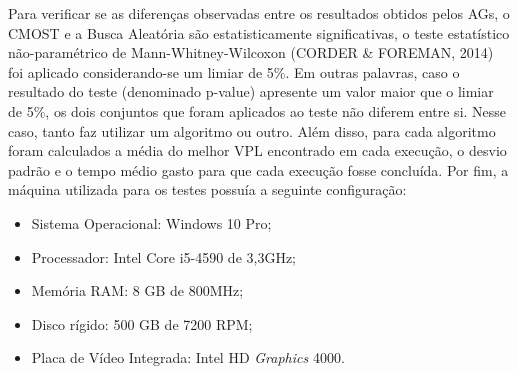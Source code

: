 \documentclass[12pt,a4paper]{report}
\begin{document}
Para verificar se as diferenças observadas entre os resultados obtidos pelos AGs, o CMOST e a Busca Aleatória são estatisticamente significativas, o teste estatístico não-paramétrico de Mann-Whitney-Wilcoxon (CORDER \& FOREMAN, 2014) foi aplicado considerando-se um limiar de 5\%. Em outras palavras, caso o resultado do teste (denominado p-value) apresente um valor maior que o limiar de 5\%, os dois conjuntos que foram aplicados ao teste não diferem entre si. Nesse caso, tanto faz utilizar um algoritmo ou outro. Além disso, para cada algoritmo foram calculados a média do melhor VPL encontrado em cada execução, o desvio padrão e o tempo médio gasto para que cada execução fosse concluída. Por fim, a máquina utilizada para os testes possuía a seguinte configuração:  

\begin{itemize}
\item Sistema Operacional: Windows 10 Pro;
\item Processador: Intel Core i5-4590 de 3,3GHz;
\item Memória RAM: 8 GB de 800MHz;
\item Disco rígido: 500 GB de 7200 RPM;
\item Placa de Vídeo Integrada: Intel HD \textit{Graphics} 4000.
\end{itemize}
\end{document}
